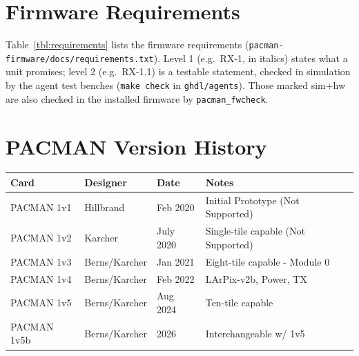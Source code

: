 \documentclass[12pt]{article}
\begin{document}
\clearpage

\newpage
\section{Firmware Requirements}\label{sec:requirements}

Table~\ref{tbl:requirements} lists the firmware requirements (\texttt{pacman-firmware/docs/requirements.txt}).
Level 1 (e.g.\ RX-1, in italics) states what a unit promises;  level 2 (e.g.\ RX-1.1) is a testable statement,
checked in simulation by the agent test benches (\texttt{make check} in \texttt{ghdl/agents}).  Those marked
sim+hw are also checked in the installed firmware by \texttt{pacman\_fwcheck}.



\section{PACMAN Version History}

\vskip 0.5cm
\begin{center}
\begin{tabular}{llll}
Card        & Designer      & Date & Notes \\
\hline
PACMAN 1v1  & Hillbrand      & Feb 2020  & Initial Prototype (Not Supported) \\
PACMAN 1v2  & Karcher        & July 2020 & Single-tile capable (Not Supported) \\
PACMAN 1v3  & Berns/Karcher  & Jan 2021  & Eight-tile capable - Module 0\\
PACMAN 1v4  & Berns/Karcher  & Feb 2022  & LArPix-v2b, Power, TX\\
PACMAN 1v5  & Berns/Karcher  & Aug 2024  & Ten-tile capable \\
PACMAN 1v5b & Berns/Karcher  & 2026      & Interchangeable w/ 1v5\\
\end{tabular}
\end{center}
\end{document}
